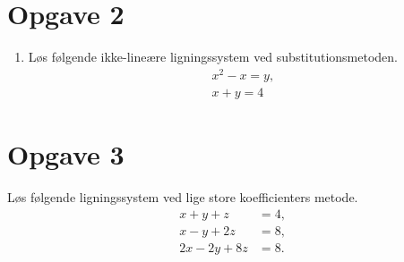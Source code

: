 \section*{Opgave 2}
\begin{enumerate}[label=\roman*)]
	\item Løs følgende ikke-lineære ligningssystem ved substitutionsmetoden.
	\begin{align*}
		x^2 -x = y,\\
		x+y = 4
	\end{align*}
\end{enumerate}

\section*{Opgave 3}
Løs følgende ligningssystem ved lige store koefficienters metode.
\begin{align*}
x+y+z&=4,\\
x-y+2z&=8,\\
2x-2y+8z&=8.
\end{align*}